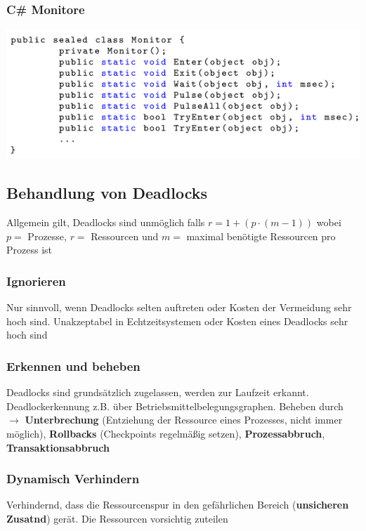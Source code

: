 \documentclass[11pt,a4paper,landscape]{article}
\begin{document}
\begin{multicols*}{3}
	\subsubsection{C\# Monitore}
	\includegraphics[width=0.65\columnwidth]{monitor_csharp}
	\subsection{Behandlung von Deadlocks}
	Allgemein gilt, Deadlocks sind unmöglich falls $r = 1 + (p \cdot (m-1))$ wobei $p =$ Prozesse, $r = $ Ressourcen und $m =$ maximal benötigte Ressourcen pro Prozess ist
	\subsubsection{Ignorieren}
	Nur sinnvoll, wenn Deadlocks selten auftreten oder Kosten der Vermeidung sehr hoch sind. Unakzeptabel in Echtzeitsystemen oder Kosten eines Deadlocks sehr hoch sind
	\subsubsection{Erkennen und beheben}
	Deadlocks sind grundsätzlich zugelassen, werden zur Laufzeit erkannt. Deadlockerkennung z.B. über Betriebsmittelbelegungsgraphen. Beheben durch $\rightarrow$ \textbf{Unterbrechung} (Entziehung der Ressource eines Prozesses, nicht immer möglich), \textbf{Rollbacks} (Checkpoints regelmäßig setzen), \textbf{Prozessabbruch}, \textbf{Transaktionsabbruch}
	\subsubsection{Dynamisch Verhindern}
	Verhindernd, dass die Ressourcenspur in den gefährlichen Bereich (\textbf{unsicheren Zusatnd}) gerät. Die Ressourcen vorsichtig zuteilen

\end{multicols*}
\end{document}
